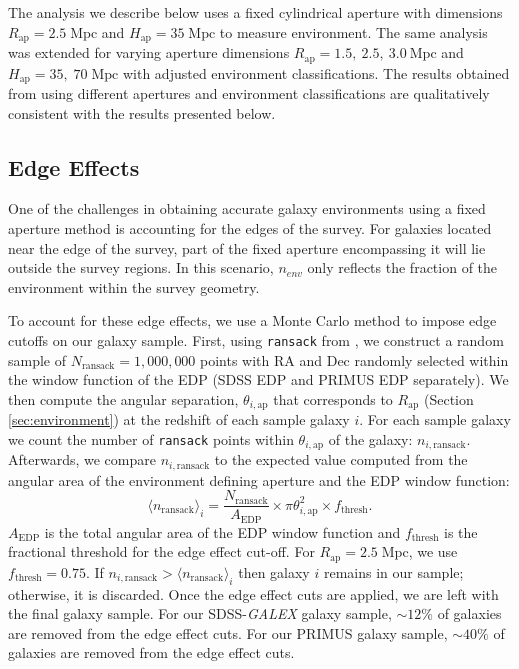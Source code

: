 \documentclass{emulateapj}
\def \apradius{2.5}
\def \apheight{35}
\begin{document}
The analysis we describe below uses a fixed cylindrical aperture with
dimensions $R_{\mathrm{ap}} = \apradius \; \mathrm{Mpc}$ and $H_{\mathrm{ap}} = \apheight
\;\mathrm{Mpc}$ to measure environment. The same analysis was
extended for varying aperture dimensions $R_{\mathrm{ap}} = 1.5, \: \apradius, \:3.0 \:
\mathrm{Mpc}$ and $H_{\mathrm{ap}} = \apheight, \; 70 \;\mathrm{Mpc}$ with adjusted environment classifications. 
The results obtained from using different apertures and
environment classifications are qualitatively consistent with the results presented below.  

\subsection{Edge Effects} \label{sec:edgeeffect}
One of the challenges in obtaining accurate galaxy environments using a fixed aperture method is accounting for the edges of the survey. For galaxies located near the edge of the survey, part of the fixed aperture encompassing it will lie outside the survey regions. In this scenario, $n_{env}$ only reflects the fraction of the environment within the survey geometry.

To account for these edge effects, we use a Monte Carlo method to impose edge cutoffs on our galaxy sample. First, using \texttt{ransack} from \cite{Swanson:2008aa}, we construct a random sample of  $N_{\mathrm{ransack}} = 1,000,000$ points with RA and Dec randomly selected within the window function of the EDP (SDSS EDP and PRIMUS EDP separately). We then compute the angular separation, $\theta_{i, \mathrm{ap}}$ that corresponds to $R_{\mathrm{ap}}$ (Section \ref{sec:environment}) at the redshift of each sample galaxy $i$. For each sample galaxy we count the number of \texttt{ransack} points within $\theta_{i, \mathrm{ap}}$ of the galaxy: $n_{i,\mathrm{ransack}}$. Afterwards, we compare $n_{i,\mathrm{ransack}}$ to the expected value computed from the angular area of the environment defining aperture and the EDP window function: 
\begin{equation} \label{eq:ransack}
\langle n_{\mathrm{ransack}}\rangle_{i} = \frac{N_{\mathrm{ransack}}}{A_{\mathrm{EDP}}}\times {\pi \theta_{i, \mathrm{ap}}^2} \times f_{\mathrm{thresh}}. 
\end{equation} 
$A_{\mathrm{EDP}}$ is the total angular area of the EDP window function and $f_{\mathrm{thresh}}$ is the fractional threshold for the edge effect cut-off. For $R_{\mathrm{ap}}= \apradius \;\mathrm{Mpc}$, we use $f_{\mathrm{thresh}} = 0.75$. If $n_{i, \mathrm{ransack}} > \langle n_{\mathrm{ransack}} \rangle_i$ then galaxy $i$ remains in our sample; otherwise, it is discarded. Once the edge effect cuts are applied, we are left with the final galaxy sample. For our SDSS-{\em GALEX} galaxy sample, $\sim 12 \%$ of galaxies are removed from the edge effect cuts. For our PRIMUS galaxy sample, $\sim 40 \%$ of galaxies are removed from the edge effect cuts. 
\end{document}
